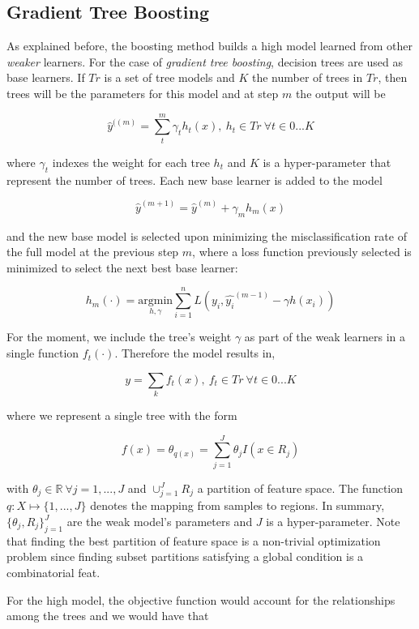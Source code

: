 \subsection{Gradient Tree Boosting}

As explained before, the boosting method builds a high model learned from other \textit{weaker} learners. For the case of \textit{gradient tree boosting}, decision trees are used as base learners. If $Tr$ is a set of tree models and $K$ the number of trees in $Tr$, then trees will be the parameters for this model and at step $m$ the output will be

\[
\hat{y}^{((m)}=  \sum_t^m \gamma_t h_t(x) , \  h_t \in Tr \ \forall t \in {0...K}
\]

where $\gamma_t$ indexes the weight for each tree $h_t$ and $K$ is a hyper-parameter that represent the number of trees. Each new base learner is added to the model 

\[
\hat{y}^{(m+1)} =   \hat{y}^{(m)}  + \gamma_m h_m(x) 
\]

and the new base model is selected upon minimizing the misclassification rate of the full model at the previous step $m$, where a loss function previously selected is minimized to select the next best base learner:

\[
h_m(\cdot) = \underset{h,\gamma}{\mathrm{argmin}}   \sum_{i=1}^{n} L ( y_i,  \hat{y_i}^{(m-1)} -  \gamma h(x_i)  ) 
\]


For the moment, we include the tree's weight $\gamma$ as part of the weak learners in a single function $f_t(\cdot)$. Therefore the model results in,

\[
y =  \sum_k f_t(x) ,  \ f_t \in Tr  \ \forall t \in {0...K}
\]

where we represent a single tree with the form 

\[
f(x) = \theta_{q(x)} = \sum_{j=1}^J \theta_j I(x \in  R_j)
\]

with $\theta_j \in \mathbb{R} \ \forall j = 1,...,J$ and $ \cup_{j=1}^J R_j$ a partition of feature space. The function $q : X \mapsto \{1,...,J\}$ denotes the mapping from samples to regions. In summary, $\{\theta_j, R_j\}_{j=1}^J$ are the weak model's parameters and $J$ is a hyper-parameter. Note that finding the best partition of feature space is a non-trivial optimization problem since finding subset partitions satisfying a global condition is a combinatorial feat.

For the high model, the objective function would account for the relationships among the trees and we would have that

